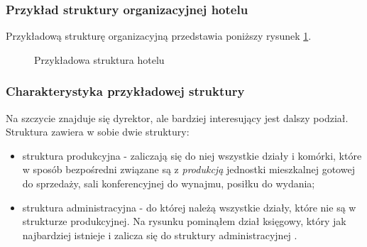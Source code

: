 \documentclass[a4paper,onecolumn,oneside,11pt,wide,floatssmall]{mwrep}
\theoremstyle{definition}
\theoremstyle{plain}%
\theoremstyle{remark}
\begin{document}
\subsubsection{Przykład struktury organizacyjnej hotelu}
Przykładową strukturę organizacyjną przedstawia poniższy rysunek 
\ref{fig:struktura-hotelu}.

\begin{figure}[H]
  \begin{center}
  \end{center}
  \caption{Przykładowa struktura hotelu}
  \label{fig:struktura-hotelu}
\end{figure}

\subsubsection{Charakterystyka przykładowej struktury}
Na szczycie znajduje się dyrektor, ale bardziej interesujący jest dalszy 
podział. Struktura zawiera w sobie dwie struktury:
\begin{itemize}
  \item struktura produkcyjna - zaliczają się do niej wszystkie działy i 
  komórki, które w sposób bezpośredni związane są z \emph{produkcją}
  jednostki mieszkalnej gotowej do sprzedaży, sali konferencyjnej do 
  wynajmu, posiłku do wydania;
  \item struktura administracyjna - do której należą wszystkie działy, które
   nie są w strukturze produkcyjnej. Na rysunku pominąłem dział księgowy, 
   który jak najbardziej istnieje i zalicza się do struktury administracyjnej
   .
\end{itemize}
\end{document}
